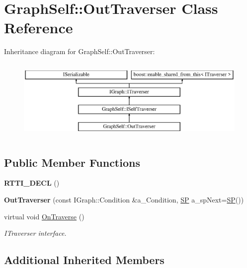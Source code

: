 \hypertarget{class_graph_self_1_1_out_traverser}{}\section{Graph\+Self\+:\+:Out\+Traverser Class Reference}
\label{class_graph_self_1_1_out_traverser}
Inheritance diagram for Graph\+Self\+:\+:Out\+Traverser\+:\begin{figure}[H]
\begin{center}
\leavevmode
\includegraphics[height=3.985765cm]{class_graph_self_1_1_out_traverser}
\end{center}
\end{figure}
\subsection*{Public Member Functions}
\begin{DoxyCompactItemize}
\item 
\mbox{\label{class_graph_self_1_1_out_traverser_aadb2d76f832db59dc30187911281fe7d}} 
{\bfseries R\+T\+T\+I\+\_\+\+D\+E\+CL} ()
\item 
\mbox{\label{class_graph_self_1_1_out_traverser_addbf566a17627fb53ad1905966c8ef3c}} 
{\bfseries Out\+Traverser} (const I\+Graph\+::\+Condition \&a\+\_\+\+Condition, \hyperlink{class_i_graph_1_1_i_traverser_a5a5ccc81423d6024742d1898a310d812}{SP} a\+\_\+sp\+Next=\hyperlink{class_i_graph_1_1_i_traverser_a5a5ccc81423d6024742d1898a310d812}{SP}())
\item 
virtual void \hyperlink{class_graph_self_1_1_out_traverser_a0f5e75bd44ae9b9cd0ae1984fd63095f}{On\+Traverse} ()
\begin{DoxyCompactList}\small\item\em I\+Traverser interface. \end{DoxyCompactList}\end{DoxyCompactItemize}
\subsection*{Additional Inherited Members}


